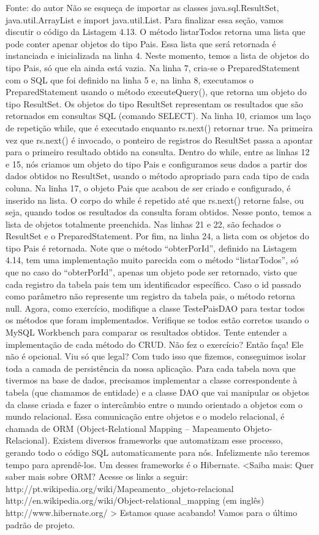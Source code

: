 Fonte: do autor
Não se esqueça de importar as classes java.sql.ResultSet, java.util.ArrayList e import java.util.List. Para finalizar essa seção, vamos discutir o código da Listagem 4.13. O método listarTodos retorna uma lista que pode conter apenar objetos do tipo Pais. Essa lista que será retornada é instanciada e inicializada na linha 4. Neste momento, temos a lista de objetos do tipo Pais, só que ela ainda está vazia. Na linha 7, cria-se o PreparedStatement com o SQL que foi definido na linha 5 e, na linha 8, executamos o PreparedStatement usando o método executeQuery(), que retorna um objeto do tipo ResultSet. Os objetos do tipo ResultSet representam os resultados que são retornados em consultas SQL (comando SELECT). Na linha 10, criamos um laço de repetição while, que é executado enquanto rs.next() retornar true. Na primeira vez que rs.next() é invocado, o ponteiro de registros do ResultSet passa a apontar para o primeiro resultado obtido na consulta. Dentro do while, entre as linhas 12 e 15, nós criamos um objeto do tipo Pais e configuramos seus dados a partir dos dados obtidos no ResultSet, usando o método apropriado para cada tipo de cada coluna. Na linha 17, o objeto Pais que acabou de ser criado e configurado, é inserido na lista. O corpo do while é repetido até que rs.next() retorne false, ou seja, quando todos os resultados da consulta foram obtidos. Nesse ponto, temos a lista de objetos totalmente preenchida. Nas linhas 21 e 22, são fechados o ResultSet e o PreparedStatement. Por fim, na linha 24, a lista com os objetos do tipo Pais é retornada. 
Note que o método “obterPorId”, definido na Listagem 4.14, tem uma implementação muito parecida com o método “listarTodos”, só que no caso do “obterPorId”, apenas um objeto pode ser retornado, visto que cada registro da tabela pais tem um identificador específico. Caso o id passado como parâmetro não represente um registro da tabela pais, o método retorna null.
Agora, como exercício, modifique a classe TestePaisDAO para testar todos os métodos que foram implementados. Verifique se todos estão corretos usando o MySQL Workbench para comparar os resultados obtidos. Tente entender a implementação de cada método do CRUD.
Não fez o exercício? Então faça! Ele não é opcional.
Viu só que legal? Com tudo isso que fizemos, conseguimos isolar toda a camada de persistência da nossa aplicação. Para cada tabela nova que tivermos na base de dados, precisamos implementar a classe correspondente à tabela (que chamamos de entidade) e a classe DAO que vai manipular os objetos da classe criada e fazer o intercâmbio entre o mundo orientado a objetos com o mundo relacional. Essa comunicação entre objetos e o modelo relacional, é chamada de ORM (Object-Relational Mapping – Mapeamento Objeto-Relacional). Existem diversos frameworks que automatizam esse processo, gerando todo o código SQL automaticamente para nós. Infelizmente não teremos tempo para aprendê-los. Um desses frameworks é o Hibernate.
<Saiba mais:
Quer saber mais sobre ORM? Acesse os links a seguir:
http://pt.wikipedia.org/wiki/Mapeamento\_objeto-relacional
http://en.wikipedia.org/wiki/Object-relational\_mapping (em inglês)
http://www.hibernate.org/
>
Estamos quase acabando! Vamos para o último padrão de projeto.



